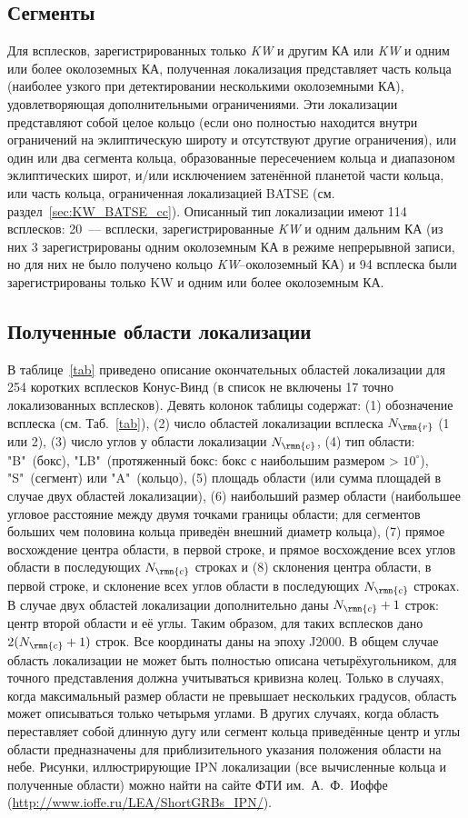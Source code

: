 \subsection{Сегменты}
Для всплесков, зарегистрированных только \textit{KW} и другим КА или \textit{KW} 
и одним или более околоземных КА, полученная локализация представляет часть кольца 
(наиболее узкого при детектировании несколькими околоземными КА), удовлетворяющая 
дополнительными ограничениями. Эти локализации представляют собой целое кольцо 
(если оно полностью находится внутри ограничений на эклиптическую широту и 
отсутствуют другие ограничения), или один или два сегмента кольца, образованные 
пересечением кольца и диапазоном эклиптических широт, и/или исключением затенённой 
планетой части кольца, или часть кольца, ограниченная локализацией BATSE (см. раздел~\ref{sec:KW_BATSE_cc}).
Описанный тип локализации имеют 114 всплесков: 20~--- всплески, зарегистрированные 
\textit{KW} и одним дальним КА (из них 3 зарегистрированы одним околоземным КА в режиме 
непрерывной записи, но для них не было получено кольцо \textit{KW}--околоземный КА) и 94 
всплеска были зарегистрированы только KW и одним или более околоземным КА.

\subsection{Полученные области локализации}
В таблице~\ref{tab} приведено описание окончательных областей локализации для 
254 коротких всплесков Конус-Винд (в список не включены 17 точно локализованных всплесков).
Девять колонок таблицы содержат: 
(1) обозначение всплеска (см. Таб.~\ref{tab}), (2) число областей локализации всплеска $N_{\rmn{r}}$ (1 или 2), 
(3) число углов у области локализации $N_{\rmn{c}}$, 
(4) тип области: "B"\ (бокс), "LB"\ (протяженный бокс: бокс с наибольшим размером > $10^\circ$),
"S"\ (сегмент) или "A"\ (кольцо), 
(5) площадь области (или сумма площадей в случае двух областей локализации), 
(6) наибольший размер области (наибольшее угловое расстояние между двумя точками границы области; 
для сегментов больших чем половина кольца приведён внешний диаметр кольца), 
(7) прямое восхождение центра области, в первой строке, и прямое восхождение 
всех углов области в последующих $N_{\rmn{c}}$ строках и 
(8) склонения центра области, в первой строке, и склонение всех углов области в последующих
$N_{\rmn{c}}$ строках. В случае двух областей локализации дополнительно даны $N_{\rmn{c}} + 1$ строк: 
центр второй области и её углы. 
Таким образом, для таких всплесков дано $2(N_{\rmn{c}} + 1)$ строк. Все координаты даны на эпоху J2000.
В общем случае область локализации не может быть полностью описана четырёхугольником, 
для точного представления должна учитываться кривизна колец. Только в случаях, 
когда максимальный размер области не превышает нескольких градусов, 
область может описываться только четырьмя углами. В других случаях, когда область переставляет
собой длинную дугу или сегмент кольца приведённые центр и углы области предназначены
для приблизительного указания положения области на небе. Рисунки, иллюстрирующие
IPN локализации (все вычисленные кольца и полученные области) можно найти на сайте
ФТИ им.~А.~Ф.~Иоффе (\url{http://www.ioffe.ru/LEA/ShortGRBs_IPN/}).

